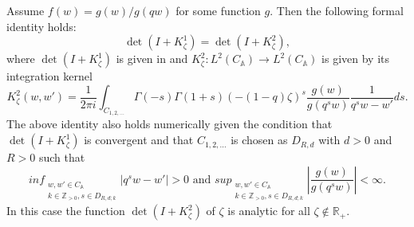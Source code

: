 \begin{proposition}
\label{step-2-mellin-barnes}
Assume $f(w) = g(w) / g(qw)$ for some function $g$. Then the following formal identity holds:
$$\det(I+K_{\zeta}^1) = \det(I+K_{\zeta}^2),$$ where $\det(I+K_{\zeta}^1)$ is given in  and $K_{\zeta}^2:L^2(C_{\mathbb{A}}) \rightarrow L^2(C_{\mathbb{A}})$ is given by its integration kernel $$K_{\zeta}^2(w,w') = \frac{1}{2 \pi i} \int_{C_{1,2,\dots}} \Gamma(-s) \Gamma(1+s) (-(1-q)\zeta)^s \frac{g(w)}{g(q^sw)} \frac{1}{q^sw - w'} ds.$$
The above identity also holds numerically given the condition that $\det(I+K_{\zeta}^1)$ is convergent and that $C_{1,2,\dots}$ is chosen as $D_{R,d}$ with $d > 0$ and $R > 0$ such that $$ inf_{\substack{ {w, w' \in C_{\mathbb{A}}} \\ {k \in \mathbb{Z}_{>0}, s \in D_{R, d;k}} }} |q^sw - w'| > 0 \text{ and } sup_{\substack{ {w,w' \in C_{\mathbb{A}}} \\ {k \in \mathbb{Z}_{>0}, s \in D_{R,d;k}} }} \left| \frac{g(w)}{g(q^s w)} \right| < \infty.$$
In this case the function $\det(I+K^2_{\zeta})$ of $\zeta$ is analytic for all $\zeta \notin \mathbb{R}_+$.
\end{proposition}


